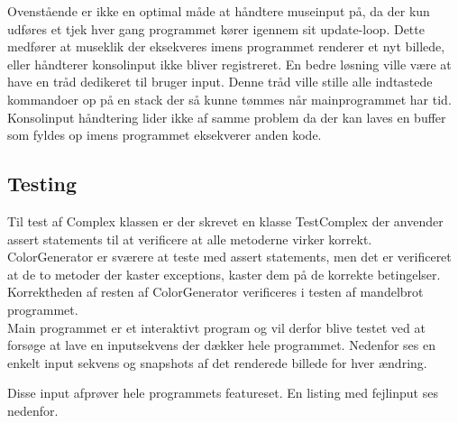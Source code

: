 Ovenstående er ikke en optimal måde at håndtere museinput på, da der kun udføres et tjek hver gang programmet kører igennem sit update-loop. Dette medfører at museklik der eksekveres imens programmet renderer et nyt billede, eller håndterer konsolinput ikke bliver registreret. En bedre løsning ville være at have en tråd dedikeret til bruger input.
Denne tråd ville stille alle indtastede kommandoer op på en stack der så kunne tømmes når mainprogrammet har tid.\\
Konsolinput håndtering lider ikke af samme problem da der kan laves en buffer som fyldes op imens programmet eksekverer anden kode.

\subsection{Testing}

Til test af Complex klassen er der skrevet en klasse TestComplex der anvender assert statements til at verificere at alle metoderne virker korrekt. \\
ColorGenerator er sværere at teste med assert statements, men det er verificeret at de to metoder der kaster exceptions, kaster dem på de korrekte betingelser. \\
Korrektheden af resten af ColorGenerator verificeres i testen af mandelbrot programmet. \\


Main programmet er et interaktivt program og vil derfor blive testet ved at forsøge at lave en inputsekvens der dækker hele programmet. Nedenfor ses en enkelt input sekvens og snapshots af det renderede billede for hver ændring.

Disse input afprøver hele programmets featureset. En listing med fejlinput ses nedenfor.

